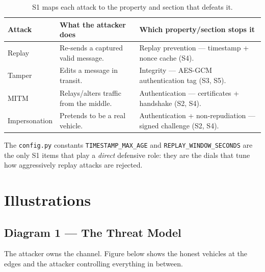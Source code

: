 \documentclass[11pt,a4paper]{report}
\begin{document}
\begin{table}[h]
\centering
\small
\begin{tabular}{@{}p{2.6cm} p{5.6cm} p{5.3cm}@{}}
\toprule
\textbf{Attack} & \textbf{What the attacker does} & \textbf{Which property/section stops it}\\
\midrule
Replay & Re-sends a captured valid message. &
Replay prevention --- timestamp + nonce cache (S4).\\
Tamper & Edits a message in transit. &
Integrity --- AES-GCM authentication tag (S3, S5).\\
MITM & Relays/alters traffic from the middle. &
Authentication --- certificates + handshake (S2, S4).\\
Impersonation & Pretends to be a real vehicle. &
Authentication + non-repudiation --- signed challenge (S2, S4).\\
\bottomrule
\end{tabular}
\caption{S1 maps each attack to the property and section that defeats it.}
\end{table}

\noindent The \texttt{config.py} constants \texttt{TIMESTAMP\_MAX\_AGE} and
\texttt{REPLAY\_WINDOW\_SECONDS} are the only S1 items that play a \emph{direct}
defensive role: they are the dials that tune how aggressively replay attacks are
rejected.

\section{Illustrations}

\subsection{Diagram 1 --- The Threat Model}
The attacker owns the channel. Figure below shows the honest vehicles at the
edges and the attacker controlling everything in between.

\begin{center}
\end{center}
\end{document}
